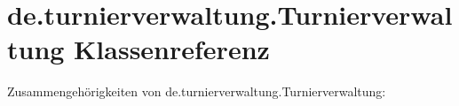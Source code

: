 \hypertarget{classde_1_1turnierverwaltung_1_1_turnierverwaltung}{}\section{de.\+turnierverwaltung.\+Turnierverwaltung Klassenreferenz}
\label{classde_1_1turnierverwaltung_1_1_turnierverwaltung}


Zusammengehörigkeiten von de.\+turnierverwaltung.\+Turnierverwaltung\+:
